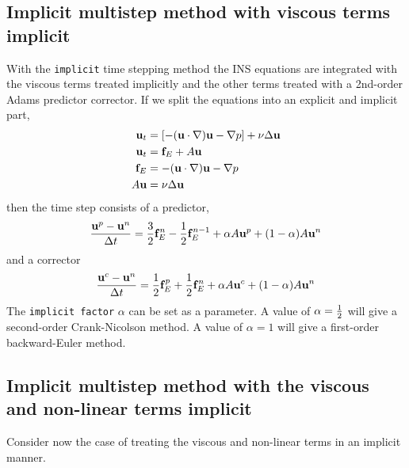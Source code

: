 \subsection{Implicit multistep method with viscous terms implicit} \label{sec:implicitMultiStep}

  With the {\tt implicit} time stepping method the INS equations are integrated with
the viscous terms treated implicitly and the other terms treated with a 2nd-order
Adams predictor corrector.
If we split the equations into an explicit and implicit part,
\begin{align*}
  \mathbf{ u}_t &= \left[ -(\mathbf{ u}\cdot\nabla)\mathbf{ u} -\nabla p \right] + \nu\Delta \mathbf{ u} \\
  \mathbf{ u}_t &= \mathbf{ f}_E + A \mathbf{ u}  \\
   \mathbf{ f}_E &= -(\mathbf{ u}\cdot\nabla)\mathbf{ u} -\nabla p \\
   A \mathbf{ u} &= \nu\Delta \mathbf{ u}
\end{align*}
then the time step consists of a predictor,
\[
 { \mathbf{ u}^p - \mathbf{ u}^n \over {\Delta t} }= {3\over2} \mathbf{ f}_E^n - {1\over2}\mathbf{ f}_E^{n-1} + \alpha A \mathbf{ u}^p + (1-\alpha)A\mathbf{ u}^n  
\]
and a corrector
\[
 { \mathbf{ u}^c - \mathbf{ u}^n \over {\Delta t} }= {1\over2} \mathbf{ f}_E^p + {1\over2}\mathbf{ f}_E^{n} + \alpha A \mathbf{ u}^c + (1-\alpha)A\mathbf{ u}^n 
\]
The {\tt implicit factor} $\alpha$ can be set as a parameter. A value of $\alpha={1\over2}$ will give a
second-order Crank-Nicolson method. A value of $\alpha=1$ will give a first-order backward-Euler method.




\subsection{Implicit multistep method with the viscous and non-linear terms implicit} 
\label{sec:implicitMultiStepNonlinear}

\newcommand{\uvl}{\uv^*} %

Consider now the case of treating the viscous and non-linear terms in an implicit manner.

